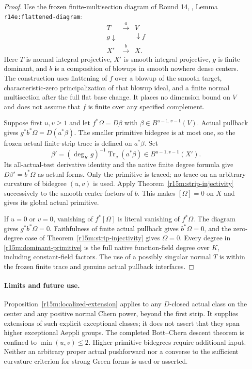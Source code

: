 \begin{proof}
Use the frozen finite-multisection diagram of Round 14,
,
Lemma \texttt{r14e:flattened-diagram}:
\[
 \begin{array}{ccc}
 T&\xrightarrow{a}&V\\
 {\scriptstyle g}\downarrow&&\downarrow{\scriptstyle f}\\
 X'&\xrightarrow{b}&X.
 \end{array}
\tag{SD15.11}\label{r15m:dominant-diagram}
\]
Here $T$ is normal integral projective, $X'$ is smooth
integral projective, $g$ is finite dominant, and $b$ is
a composition of blowups in smooth nowhere dense centers.
The construction uses flattening of $f$ over a blowup of
the smooth target, characteristic-zero principalization
of that blowup ideal, and a finite normal multisection
after the full flat base change.  It places no dimension
bound on $V$ and does not assume that $f$ is finite over
any specified complement.

Suppose first $u,v\geq1$ and let
$f^*\Omega=D\beta$ with
$\beta\in B^{u-1,v-1}(V)$.  Actual pullback gives
$g^*b^*\Omega=D(a^*\beta)$.
The smaller primitive bidegree is at most one, so the
frozen actual finite-strip trace is defined on $a^*\beta$.
Set
\[
       \beta'=(\deg_K g)^{-1}\operatorname{Tr}_g(a^*\beta)
                              \in B^{u-1,v-1}(X').
\tag{SD15.12}\label{r15m:dominant-primitive}
\]
Its all-actual-test derivative identity and the native
finite degree formula give $D\beta'=b^*\Omega$ as
actual forms.  Only the primitive is traced; no trace
on an arbitrary curvature of bidegree $(u,v)$ is used.
Apply Theorem~\ref{r15m:strip-injectivity} successively
to the smooth-center factors of $b$.  This makes
$[\Omega]=0$ on $X$ and gives its global actual primitive.

If $u=0$ or $v=0$, vanishing of $f^*[\Omega]$ is
literal vanishing of $f^*\Omega$.  The diagram gives
$g^*b^*\Omega=0$.  Faithfulness of finite actual pullback
gives $b^*\Omega=0$, and the zero-degree case of
Theorem~\ref{r15m:strip-injectivity} gives $\Omega=0$.
Every degree in \eqref{r15m:dominant-primitive} is the
full native function-field degree over $K$, including
constant-field factors.  The use of a possibly singular
normal $T$ is within the frozen finite trace and genuine
actual pullback interfaces.
\end{proof}

\paragraph{Limits and future use.}
Proposition~\ref{r15m:localized-extension} applies to any
$D$-closed actual class on the center and any positive
normal Chern power, beyond the first strip.  It supplies
extensions of such explicit exceptional classes; it does
not assert that they span higher exceptional Aeppli groups.
The completed Bott--Chern descent theorem is confined to
$\min(u,v)\leq2$.  Higher primitive bidegrees require
additional input.  Neither an arbitrary proper actual
pushforward nor a converse to the sufficient curvature
criterion for strong Green forms is used or asserted.
